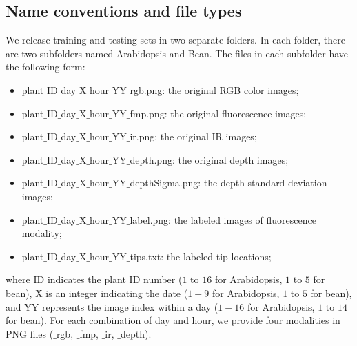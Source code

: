 \subsection{Name conventions and file types}
We release training and testing sets in two separate folders.
In each folder, there are two subfolders named Arabidopsis and Bean.
The files in each subfolder have the following form:

\begin{itemize}
\item plant$\_$ID$\_$day$\_$X$\_$hour$\_$YY$\_$rgb.png: the original RGB color images;
\item plant$\_$ID$\_$day$\_$X$\_$hour$\_$YY$\_$fmp.png: the original fluorescence images;
\item plant$\_$ID$\_$day$\_$X$\_$hour$\_$YY$\_$ir.png: the original IR images;
\item plant$\_$ID$\_$day$\_$X$\_$hour$\_$YY$\_$depth.png: the original depth images;
\item plant$\_$ID$\_$day$\_$X$\_$hour$\_$YY$\_$depthSigma.png: the depth standard deviation images;
\item plant$\_$ID$\_$day$\_$X$\_$hour$\_$YY$\_$label.png: the labeled images of fluorescence modality;
\item plant$\_$ID$\_$day$\_$X$\_$hour$\_$YY$\_$tips.txt: the labeled tip locations;
\end{itemize}
where ID indicates the plant ID number ($1$ to $16$ for Arabidopsis, $1$ to $5$ for bean), X is an integer indicating the date ($1-9$ for Arabidopsis, $1$ to $5$ for bean), and YY represents the image index within a day ($1-16$ for Arabidopsis, $1$ to $14$ for bean).
For each combination of day and hour, we provide four modalities in PNG files ($\_$rgb, $\_$fmp, $\_$ir, $\_$depth).
